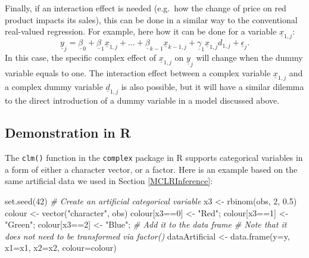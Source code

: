 \documentclass[
]{book}
\newenvironment{Shaded}{\begin{snugshade}}{\end{snugshade}}
\newcommand{\AttributeTok}[1]{\textcolor[rgb]{0.77,0.63,0.00}{#1}}
\newcommand{\CommentTok}[1]{\textcolor[rgb]{0.56,0.35,0.01}{\textit{#1}}}
\newcommand{\DecValTok}[1]{\textcolor[rgb]{0.00,0.00,0.81}{#1}}
\newcommand{\FloatTok}[1]{\textcolor[rgb]{0.00,0.00,0.81}{#1}}
\newcommand{\FunctionTok}[1]{\textcolor[rgb]{0.00,0.00,0.00}{#1}}
\newcommand{\NormalTok}[1]{#1}
\newcommand{\OtherTok}[1]{\textcolor[rgb]{0.56,0.35,0.01}{#1}}
\newcommand{\SpecialCharTok}[1]{\textcolor[rgb]{0.00,0.00,0.00}{#1}}
\newcommand{\StringTok}[1]{\textcolor[rgb]{0.31,0.60,0.02}{#1}}
\begin{document}
Finally, if an interaction effect is needed (e.g.~how the change of price on red product impacts its sales), this can be done in a similar way to the conventional real-valued regression. For example, here how it can be done for a variable \(\underline{x}_{1,j}\):
\begin{equation}
    \underline{y}_j = \underline{\beta}_0 + \underline{\beta}_1 \underline{x}_{1,j} + \dots + \underline{\beta}_{k-1} \underline{x}_{k-1,j} + \underline{\gamma}_1 \underline{x}_{1,j} d_{1,j} + \underline{\epsilon}_j .
    \label{eq:MultipleCLRComplexDummyInteraction}
\end{equation}
In this case, the specific complex effect of \(\underline{x}_{1,j}\) on \(\underline{y}_j\) will change when the dummy variable equals to one. The interaction effect between a complex variable \(\underline{x}_{1,j}\) and a complex dummy variable \(\underline{d}_{1,j}\) is also possible, but it will have a similar dilemma to the direct introduction of a dummy variable in a model discussed above.

\hypertarget{demonstration-in-r-2}{%
\subsection{Demonstration in R}\label{demonstration-in-r-2}}

The \texttt{clm()} function in the \texttt{complex} package in R supports categorical variables in a form of either a character vector, or a factor. Here is an example based on the same artificial data we used in Section \ref{MCLRInference}:

\begin{Shaded}
\begin{Highlighting}[]
\FunctionTok{set.seed}\NormalTok{(}\DecValTok{42}\NormalTok{)}
\CommentTok{\# Create an artificial categorical variable}
\NormalTok{x3 }\OtherTok{\textless{}{-}} \FunctionTok{rbinom}\NormalTok{(obs, }\DecValTok{2}\NormalTok{, }\FloatTok{0.5}\NormalTok{)}
\NormalTok{colour }\OtherTok{\textless{}{-}} \FunctionTok{vector}\NormalTok{(}\StringTok{"character"}\NormalTok{, obs)}
\NormalTok{colour[x3}\SpecialCharTok{==}\DecValTok{0}\NormalTok{] }\OtherTok{\textless{}{-}} \StringTok{"Red"}\NormalTok{;}
\NormalTok{colour[x3}\SpecialCharTok{==}\DecValTok{1}\NormalTok{] }\OtherTok{\textless{}{-}} \StringTok{"Green"}\NormalTok{;}
\NormalTok{colour[x3}\SpecialCharTok{==}\DecValTok{2}\NormalTok{] }\OtherTok{\textless{}{-}} \StringTok{"Blue"}\NormalTok{;}
\CommentTok{\# Add it to the data frame}
\CommentTok{\# Note that it does not need to be transformed via factor()}
\NormalTok{dataArtificial }\OtherTok{\textless{}{-}} \FunctionTok{data.frame}\NormalTok{(}\AttributeTok{y=}\NormalTok{y, }\AttributeTok{x1=}\NormalTok{x1, }\AttributeTok{x2=}\NormalTok{x2, }\AttributeTok{colour=}\NormalTok{colour)}
\end{Highlighting}
\end{Shaded}
\end{document}
